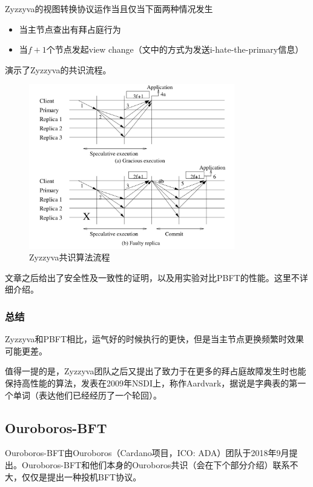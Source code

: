 Zyzzyva的视图转换协议运作当且仅当下面两种情况发生
\begin{itemize}
	\item 当主节点查出有拜占庭行为
	\item 当$f+1$个节点发起view change（文中的方式为发送i-hate-the-primary信息）
\end{itemize}
演示了Zyzzyva的共识流程。

\begin{figure}
	\centering
	\includegraphics[width=0.8\textwidth]{../common/zyzzyva_1.png}
	\caption{Zyzzyva共识算法流程} 
	\label{fig:zyzzyva1}
\end{figure}

文章之后给出了安全性及一致性的证明，以及用实验对比PBFT的性能。这里不详细介绍。

\subsubsection{总结}
Zyzzyva和PBFT相比，运气好的时候执行的更快，但是当主节点更换频繁时效果可能更差。

值得一提的是，Zyzzyva团队之后又提出了致力于在更多的拜占庭故障发生时也能保持高性能的算法，发表在2009年NSDI上\cite{clement2009making}，称作Aardvark，据说是字典表的第一个单词（表达他们已经经历了一个轮回）。

\subsection{Ouroboros-BFT}
Ouroboros-BFT由Ouroboros（Cardano项目，ICO: ADA）团队于2018年9月提出\cite{kiayias2018ouroboros}。Ouroboros-BFT和他们本身的Ouroboros共识（会在下个部分介绍）联系不大，仅仅是提出一种投机BFT协议。

